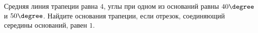 \begin{ex}
	\begin{condition}
		Средняя линия трапеции равна \( 4 \), углы при одном из оснований равны \( 40\degree \) и \( 50\degree \). Найдите основания трапеции, если отрезок, соединяющий середины оснований, равен \( 1 \).
	\end{condition}
\end{ex}